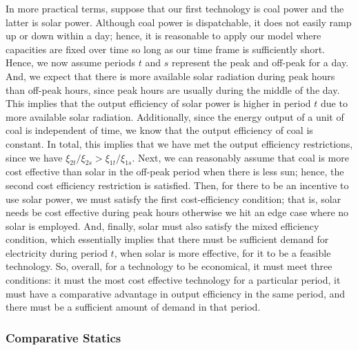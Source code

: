 \documentclass[11pt,a4paper]{extarticle}
\begin{document}
In more practical terms, suppose that our first technology is coal power and the latter is solar power. Although coal power is dispatchable, it does not easily ramp up or down within a day; hence, it is reasonable to apply our model where capacities are fixed over time so long as our time frame is sufficiently short. Hence, we now assume periods $t$ and $s$ represent the peak and off-peak for a day. And, we expect that there is more available solar radiation during peak hours than off-peak hours, since peak hours are usually during the middle of the day. This implies that the output efficiency of solar power is higher in period $t$ due to more available solar radiation. Additionally, since the energy output of a unit of coal is independent of time, we know that the output efficiency of coal is constant. In total, this implies that we have met the output efficiency restrictions, since we have $\xi_{2t}/\xi_{2s} > \xi_{1t}/\xi_{1s}$. Next, we can reasonably assume that coal is more cost effective than solar in the off-peak period when there is less sun; hence, the second cost efficiency restriction is satisfied. Then, for there to be an incentive to use solar power, we must satisfy the first cost-efficiency condition; that is, solar needs be cost effective during peak hours otherwise we hit an edge case where no solar is employed. And, finally, solar must also satisfy the mixed efficiency condition, which essentially implies that there must be sufficient demand for electricity during period $t$, when solar is more effective, for it to be a feasible technology. So, overall, for a technology to be economical, it must meet three conditions: it must the most cost effective technology for a particular period, it must have a comparative advantage in output efficiency in the same period, and there must be a sufficient amount of demand in that period. 



\subsubsection{Comparative Statics}
\end{document}
